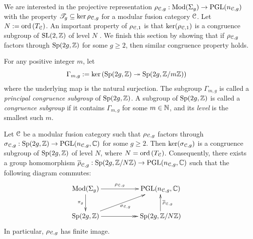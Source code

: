 \documentclass[11pt]{article}
\begin{document}
We are interested in the projective representation $\rho_{{\mathcal{C}}, {g}} : \operatorname{Mod}(\Sigma_{g}) \rightarrow \operatorname{PGL}(n_{{\mathcal{C}}, {g}})$ with the property $\mathscr{T}_{g} \subseteq \operatorname{ker}\rho_{{\mathcal{C}}, {g}}$ for a  modular fusion category $\mathcal{C}$. Let $N := {\operatorname{ord}\,}(T_{\mathcal{C}})$.  An important property of $\rho_{{\mathcal{C}}, {1}}$ is that $\operatorname{ker}(\rho_{{\mathcal{C}}, {1}})$ is a congruence subgroup of ${\operatorname{SL}}(2, {\mathbb{Z}})$ of level $N$ \cite[Thm.~6.8]{NS10}. We finish this section by showing that if $\rho_{{\mathcal{C}}, {g}}$ factors through ${\operatorname{Sp}}(2g, {\mathbb{Z}})$ for some $g \ge 2$, then similar congruence property holds.

For any positive integer $m$, let
$$
\Gamma_{m, g} := \operatorname{ker}\left({\operatorname{Sp}}(2g, \mathbb{Z}) \twoheadrightarrow {\operatorname{Sp}}(2g,{\mathbb{Z}}/m{\mathbb{Z}})\right) 
$$
where the underlying map is the natural surjection. The subgroup $\Gamma_{m, g}$  is called a \emph{principal congruence subgroup} of  ${\operatorname{Sp}}(2g, \mathbb{Z})$.  A subgroup of ${\operatorname{Sp}}(2g, {\mathbb{Z}})$ is called a \emph{congruence subgroup} if it contains $\Gamma_{m, g}$ for some $m \in {\mathbb{N}}$, and its \emph{level} is the smallest such $m$.


\begin{thm}
\label{thm:congruence-kernel} Let $\mathcal{C}$ be a modular fusion category such that $\rho_{{\mathcal{C}}, {g}}$ factors through ${\sigma}_{\mathcal{C},g}:{\operatorname{Sp}}(2g, {\mathbb{Z}}) \rightarrow {\operatorname{PGL}(n_{{\mathcal{C}}, {g}}, {\mathbb{C}})}$ for some $g \ge 2$. Then $\operatorname{ker}({\sigma}_{\mathcal{C},g})$ is a congruence subgroup of ${\operatorname{Sp}}(2g, \mathbb{Z})$ of level $N$, where $N = {\operatorname{ord}\,}(T_{\mathcal{C}})$. Consequently, there exists a group homomorphism $\overline{\rho}_{\mathcal{C}, g}: {\operatorname{Sp}}(2g, {\mathbb{Z}}/N{\mathbb{Z}}) \rightarrow \operatorname{PGL}(n_{{\mathcal{C}}, {g}}, {\mathbb{C}})$ such that the following diagram commutes:
\begin{equation}
\xymatrix{
\mcg{g} \ar^-{\RTrep{\cC}{g}}[rr] \ar_-{\pi_g}[d] && \PGL(\ncg{\cC}{g}, \bC) \\
\Sp(2g, \bZ) \ar_-{\s_{\cC, g}}[urr] 
\ar@{->>}[rr]
&&\Sp(2g, \bZ/N\bZ) \ar_-{\ol{\rho}_{\cC, g}}[u]
}    
\end{equation}
In particular, $\rho_{{\mathcal{C}}, {g}}$ has finite image. 
\end{thm}
\end{document}
